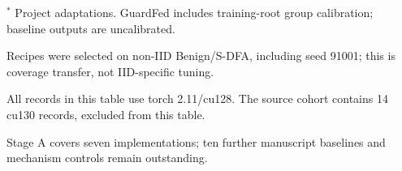 \begin{table}[t]
\begin{minipage}{\textwidth}
$^{*}$ Project adaptations. GuardFed includes training-root group calibration; baseline outputs are uncalibrated.\par
Recipes were selected on non-IID Benign/S-DFA, including seed 91001; this is coverage transfer, not IID-specific tuning.\par
All records in this table use torch 2.11/cu128. The source cohort contains 14 cu130 records, excluded from this table.\par
Stage A covers seven implementations; ten further manuscript baselines and mechanism controls remain outstanding.\par
\end{minipage}
\end{table}
